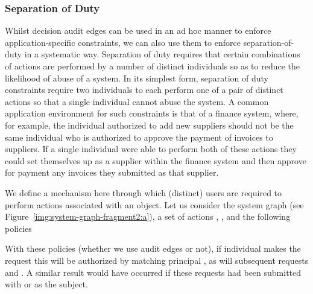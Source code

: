 \documentclass{article}
\begin{document}
\subsubsection{Separation of Duty}\label{sec:extended_typed_edges:decision_audit_edges:separation_of_duty}
Whilst decision audit edges can be used in an ad hoc manner to enforce application-specific constraints, we can also use them to enforce separation-of-duty in a systematic way.
Separation of duty requires that certain combinations of actions are performed by a number of distinct individuals so as to reduce the likelihood of abuse of a system.
In its simplest form, separation of duty constraints require two individuals to each perform one of a pair of distinct actions so that a single individual cannot abuse the system.
A common application environment for such constraints is that of a finance system, where, for example, the individual authorized to add new suppliers should not be the same individual who is authorized to approve the payment of invoices to suppliers.
If a single individual were able to perform both of these actions they could set themselves up as a supplier within the finance system and then approve for payment any invoices they submitted as that supplier.

We define a mechanism here through which  (distinct) users are required to perform  actions associated with an object.
Let us consider the system graph  (see Figure~\ref{img:system-graph-fragment2:a}), a set of actions , , and the following policies

With these policies (whether we use audit edges or not), if individual  makes the request  this will be authorized by matching principal , as will subsequent requests  and .
A similar result would have occurred if these requests had been submitted with  or  as the subject.
\end{document}
